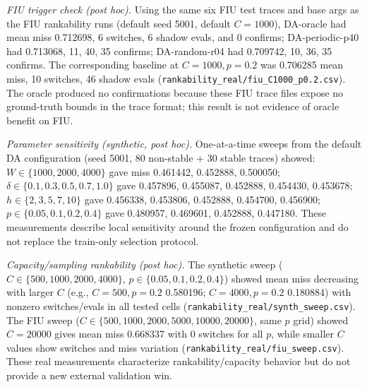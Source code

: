 \documentclass[journal,onecolumn]{IEEEtran}
\begin{document}
\emph{FIU trigger check (post hoc).} Using the same six FIU test traces and
base args as the FIU rankability runs (default seed 5001, default $C=1000$),
DA-oracle had mean miss 0.712698, 6 switches, 6 shadow evals, and 0 confirms;
DA-periodic-p40 had 0.713068, 11, 40, 35 confirms; DA-random-r04 had
0.709742, 10, 36, 35 confirms. The corresponding baseline at $C=1000, p=0.2$
was 0.706285 mean miss, 10 switches, 46 shadow evals
(\texttt{rankability\_real/fiu\_C1000\_p0.2.csv}). The oracle produced no
confirmations because these FIU trace files expose no ground-truth bounds in
the trace format; this result is not evidence of oracle benefit on FIU.

\emph{Parameter sensitivity (synthetic, post hoc).} One-at-a-time sweeps from
the default DA configuration (seed 5001, 80 non-stable + 30 stable traces)
showed: $W\in\{1000,2000,4000\}$ gave miss 0.461442, 0.452888, 0.500050;
$\delta\in\{0.1,0.3,0.5,0.7,1.0\}$ gave 0.457896, 0.455087, 0.452888,
0.454430, 0.453678; $h\in\{2,3,5,7,10\}$ gave 0.456338, 0.453806, 0.452888,
0.454700, 0.456900; $p\in\{0.05,0.1,0.2,0.4\}$ gave 0.480957, 0.469601,
0.452888, 0.447180. These measurements describe local sensitivity around the
frozen configuration and do not replace the train-only selection protocol.

\emph{Capacity/sampling rankability (post hoc).} The synthetic sweep
($C\in\{500,1000,2000,4000\}$, $p\in\{0.05,0.1,0.2,0.4\}$) showed mean miss
decreasing with larger $C$ (e.g., $C=500,p=0.2$ 0.580196; $C=4000,p=0.2$
0.180884) with nonzero switches/evals in all tested cells
(\texttt{rankability\_real/synth\_sweep.csv}). The FIU sweep
($C\in\{500,1000,2000,5000,10000,20000\}$, same $p$ grid) showed
$C=20000$ gives mean miss 0.668337 with 0 switches for all $p$, while smaller
$C$ values show switches and miss variation
(\texttt{rankability\_real/fiu\_sweep.csv}). These real measurements
characterize rankability/capacity behavior but do not provide a new external
validation win.
\end{document}

